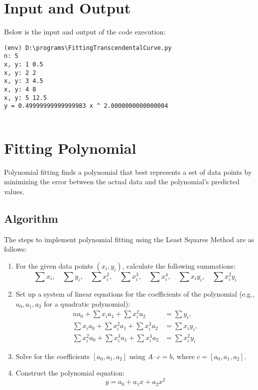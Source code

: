 \documentclass[12pt]{article}
\begin{document}
                        
    \section*{Input and Output}
    \noindent Below is the input and output of the code execution:
                
    {\small
    \begin{verbatim}
(env) D:\programs\FittingTranscendentalCurve.py
n: 5
x, y: 1 0.5
x, y: 2 2
x, y: 3 4.5
x, y: 4 8
x, y: 5 12.5
y = 0.49999999999999983 x ^ 2.0000000000000004
        
    \end{verbatim}
    }

    \newpage
\section*{Fitting Polynomial}

Polynomial fitting finds a polynomial that best represents a set of data points by minimizing the error between the actual data and the polynomial's predicted values. 
\subsection*{Algorithm}
The steps to implement polynomial fitting using the Least Squares Method are as follows:

\begin{enumerate}
    \item For the given data points \( (x_i, y_i) \), calculate the following summations:
    \[
        \sum x_i, \quad \sum y_i, \quad \sum x_i^2, \quad \sum x_i^3, \quad \sum x_i^4, \quad \sum x_i y_i, \quad \sum x_i^2 y_i
    \]
    \item Set up a system of linear equations for the coefficients of the polynomial (e.g., \( a_0, a_1, a_2 \) for a quadratic polynomial):
    \[
    \begin{aligned}
        n a_0 + \sum x_i a_1 + \sum x_i^2 a_2 &= \sum y_i, \\
        \sum x_i a_0 + \sum x_i^2 a_1 + \sum x_i^3 a_2 &= \sum x_i y_i, \\
        \sum x_i^2 a_0 + \sum x_i^3 a_1 + \sum x_i^4 a_2 &= \sum x_i^2 y_i
    \end{aligned}
    \]
    
    \item Solve for the coefficients \( [a_0, a_1, a_2] \) using \( A \cdot c = b \), where \( c = [a_0, a_1, a_2] \).
    \item Construct the polynomial equation:
    \[
        y = a_0 + a_1 x + a_2 x^2
    \]
\end{enumerate}
\end{document}

